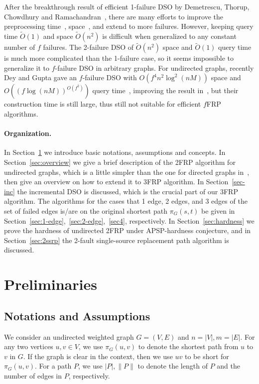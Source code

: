 \documentclass[11pt]{article}
\theoremstyle{plain}
\theoremstyle{definition}
\begin{document}
After the breakthrough result of efficient 1-failure DSO by Demetrescu, Thorup, Chowdhury and Ramachandran~\cite{Demetrescu2008}, there are many efforts to improve the preprocessing time~\cite{BK08,2009A,GV12,GV20,CC19,REN22,GR21}, space~\cite{DZ17}, and extend to more failures. However, keeping query time $\tilde{O}(1)$ and space $\tilde{O}(n^2)$ is difficult when generalized to any constant number of $f$ failures. The 2-failure DSO of $\tilde{O}(n^2)$ space and $\tilde{O}(1)$ query time~\cite{duan2009dual} is much more complicated than the 1-failure case, so it seems impossible to generalize it to $f$-failure DSO in arbitrary graphs. For undirected graphs, recently Dey and Gupta gave an $f$-failure DSO with $O(f^4n^2\log^2(nM))$ space and $O((f\log(nM))^{O(f^2)})$ query time~\cite{DG24_stoc}, improving the result in~\cite{DR22}, but their construction time is still large, thus still not suitable for efficient $f$FRP algorithms. 

\paragraph{Organization.}

In Section~\ref{sec:prelim} we introduce basic notations, assumptions and concepts. In Section~\ref{sec:overview} we give a brief description of the 2FRP algorithm for undirected graphs, which is a little simpler than the one for directed graphs in~\cite{WWX22}, then give an overview on how to extend it to 3FRP algorithm. In Section~\ref{sec-inc} the incremental DSO is discussed, which is the crucial part of our 3FRP algorithm. The algorithms for the cases that 1 edge, 2 edges, and 3 edges of the set of failed edges is/are on the original shortest path $\pi_G(s,t)$ be given in Section~\ref{sec:1-edge},~\ref{sec:2-edge},~\ref{sec4}, respectively. In Section~\ref{sec:hardness} we prove the hardness of undirected 2FRP under APSP-hardness conjecture, and in Section~\ref{sec:2ssrp} the 2-fault single-source replacement path algorithm is discussed. \section{Preliminaries}\label{sec:prelim}

\subsection{Notations and Assumptions}

We consider an undirected weighted graph $G=(V,E)$ and $n=|V|, m=|E|$. For any two vertices $u,v \in V$, we use $\pi_G(u,v)$ to denote the shortest path from $u$ to $v$ in $G$. If the graph is clear in the context, then we use $uv$ to be short for $\pi_G(u,v)$. For a path $P$, we use $|P|, \| P \|$ to denote the length of $P$ and the number of edges in $P$, respectively.
\end{document}
